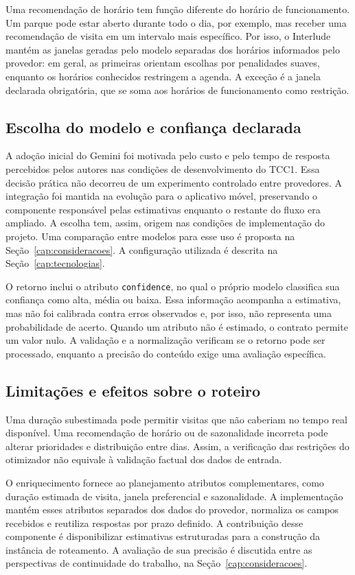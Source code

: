 Uma recomendação de horário tem função diferente do horário de funcionamento. Um parque pode estar aberto durante todo o dia, por exemplo, mas receber uma recomendação de visita em um intervalo mais específico. Por isso, o Interlude mantém as janelas geradas pelo modelo separadas dos horários informados pelo provedor: em geral, as primeiras orientam escolhas por penalidades suaves, enquanto os horários conhecidos restringem a agenda. A exceção é a janela declarada obrigatória, que se soma aos horários de funcionamento como restrição.

\subsection{Escolha do modelo e confiança declarada}

A adoção inicial do Gemini foi motivada pelo custo e pelo tempo de resposta percebidos pelos autores nas condições de desenvolvimento do TCC1. Essa decisão prática não decorreu de um experimento controlado entre provedores. A integração foi mantida na evolução para o aplicativo móvel, preservando o componente responsável pelas estimativas enquanto o restante do fluxo era ampliado. A escolha tem, assim, origem nas condições de implementação do projeto. Uma comparação entre modelos para esse uso é proposta na Seção~\ref{cap:consideracoes}. A configuração utilizada é descrita na Seção~\ref{cap:tecnologias}.

O retorno inclui o atributo \texttt{confidence}, no qual o próprio modelo classifica sua confiança como alta, média ou baixa. Essa informação acompanha a estimativa, mas não foi calibrada contra erros observados e, por isso, não representa uma probabilidade de acerto. Quando um atributo não é estimado, o contrato permite um valor nulo. A validação e a normalização verificam se o retorno pode ser processado, enquanto a precisão do conteúdo exige uma avaliação específica.

\subsection{Limitações e efeitos sobre o roteiro}

Uma duração subestimada pode permitir visitas que não caberiam no tempo real disponível. Uma recomendação de horário ou de sazonalidade incorreta pode alterar prioridades e distribuição entre dias. Assim, a verificação das restrições do otimizador não equivale à validação factual dos dados de entrada.

O enriquecimento fornece ao planejamento atributos complementares, como duração estimada de visita, janela preferencial e sazonalidade. A implementação mantém esses atributos separados dos dados do provedor, normaliza os campos recebidos e reutiliza respostas por prazo definido. A contribuição desse componente é disponibilizar estimativas estruturadas para a construção da instância de roteamento. A avaliação de sua precisão é discutida entre as perspectivas de continuidade do trabalho, na Seção~\ref{cap:consideracoes}.

